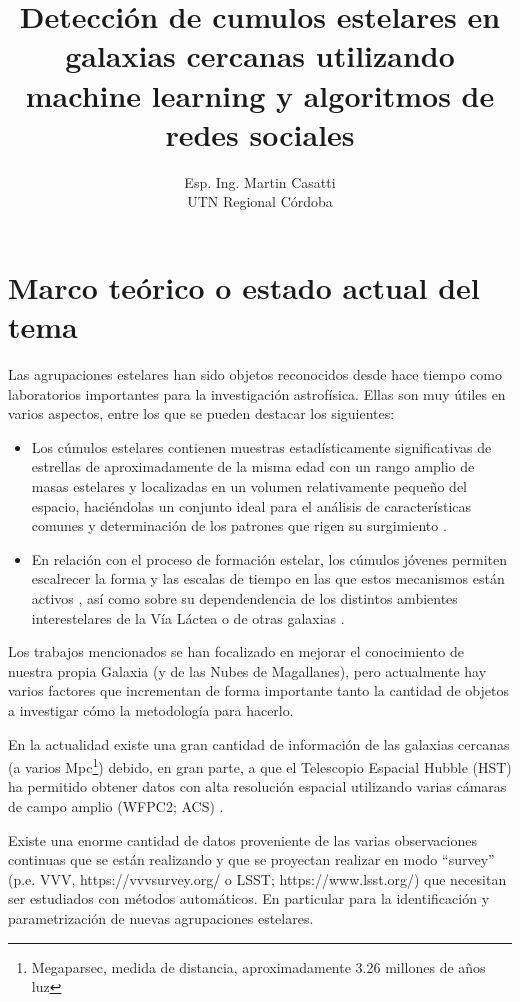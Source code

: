 \documentclass[
	11pt,oneside,a4paper,
	headsepline,footsepline,plainfootsepline,plainheadsepline,
	fleqn,
]{article}
\title{Detección de cumulos estelares en galaxias cercanas utilizando machine learning y algoritmos de redes sociales}
\author{Esp. Ing. Martin Casatti\\ UTN Regional Córdoba}
\begin{document}
\maketitle

\section{Marco teórico o estado actual del tema}

Las agrupaciones estelares han sido objetos reconocidos desde hace tiempo como laboratorios importantes para la investigación astrofísica. Ellas son muy útiles en varios aspectos, entre los que se pueden destacar los siguientes:

\begin{itemize}
	\item Los cúmulos estelares contienen muestras estadísticamente significativas de estrellas de aproximadamente de la misma edad con un rango amplio de masas estelares y localizadas en un volumen relativamente pequeño del espacio, haciéndolas un conjunto ideal para el análisis de características comunes y determinación de los patrones que rigen su surgimiento \cite{Klessen2000}.
	\item En relación con el proceso de formación estelar, los cúmulos jóvenes permiten escalrecer la forma y las escalas de tiempo en las que estos mecanismos están activos \cite{Sung1998},
	así como sobre su dependendencia de los distintos ambientes interestelares de la Vía Láctea o de otras
	galaxias \cite{Fall2012}.	
\end{itemize}

Los trabajos mencionados se han focalizado en mejorar el conocimiento de nuestra propia Galaxia (y de las Nubes de Magallanes\cite{Vazquez2008}), pero actualmente hay varios factores que incrementan de forma importante tanto la cantidad de objetos a investigar cómo la metodología para hacerlo.

En la actualidad existe una gran cantidad de información de las galaxias cercanas (a varios Mpc\footnote{Megaparsec, medida de distancia, aproximadamente 3.26 millones de años luz}) debido, en gran parte, a que el Telescopio Espacial Hubble (HST) ha permitido obtener datos con alta resolución espacial utilizando varias cámaras de campo amplio (WFPC2; ACS) \cite{Dalcanton2009}.

Existe una enorme cantidad de datos proveniente de las varias observaciones continuas que se están realizando y que se proyectan realizar en modo “survey” (p.e. VVV, https://vvvsurvey.org/ o LSST; https://www.lsst.org/) que necesitan ser estudiados con métodos automáticos. En particular para la identificación y parametrización de nuevas agrupaciones estelares.
\end{document}
